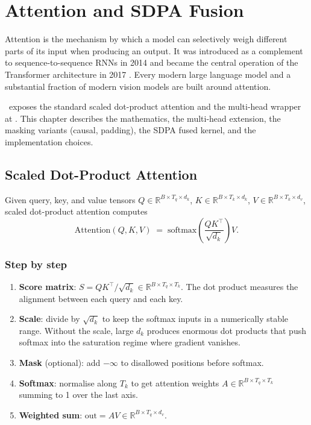 \chapter{Attention and SDPA Fusion}
\label{ch:attention}

Attention is the mechanism by which a model can selectively
weigh different parts of its input when producing an output. It
was introduced as a complement to sequence-to-sequence RNNs in
2014 and became the central operation of the Transformer
architecture in 2017 \cite{vaswani_attention_2017}. Every
modern large language model and a substantial fraction of
modern vision models are built around attention.

\Lucid\ exposes the standard scaled dot-product attention and the
multi-head wrapper at . This
chapter describes the mathematics, the multi-head extension, the
masking variants (causal, padding), the SDPA fused kernel, and
the implementation choices.

\section{Scaled Dot-Product Attention}
\label{sec:attention:sdpa}

Given query, key, and value tensors $Q \in \mathbb{R}^{B \times
T_q \times d_k}$, $K \in \mathbb{R}^{B \times T_k \times d_k}$,
$V \in \mathbb{R}^{B \times T_k \times d_v}$, scaled dot-product
attention computes
\[
\mathrm{Attention}(Q, K, V) \;=\; \mathrm{softmax}\!\left(\frac{Q K^\top}{\sqrt{d_k}}\right) V.
\]

\subsection{Step by step}
\label{ssec:attention:sdpa_steps}

\begin{enumerate}
  \item \textbf{Score matrix}: $S = Q K^\top / \sqrt{d_k} \in
    \mathbb{R}^{B \times T_q \times T_k}$. The dot product
    measures the alignment between each query and each key.
  \item \textbf{Scale}: divide by $\sqrt{d_k}$ to keep the
    softmax inputs in a numerically stable range. Without the
    scale, large $d_k$ produces enormous dot products that push
    softmax into the saturation regime where gradient vanishes.
  \item \textbf{Mask} (optional): add $-\infty$ to disallowed
    positions before softmax.
  \item \textbf{Softmax}: normalise along $T_k$ to get attention
    weights $A \in \mathbb{R}^{B \times T_q \times T_k}$
    summing to 1 over the last axis.
  \item \textbf{Weighted sum}: $\mathrm{out} = A V \in
    \mathbb{R}^{B \times T_q \times d_v}$.
\end{enumerate}

